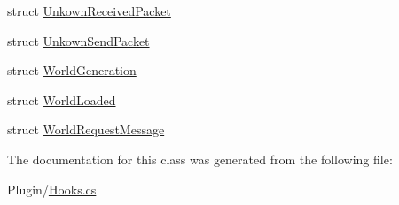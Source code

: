\begin{DoxyCompactItemize}
\item 
struct \hyperlink{structOTA_1_1Plugin_1_1HookArgs_1_1UnkownReceivedPacket}{Unkown\+Received\+Packet}
\item 
struct \hyperlink{structOTA_1_1Plugin_1_1HookArgs_1_1UnkownSendPacket}{Unkown\+Send\+Packet}
\item 
struct \hyperlink{structOTA_1_1Plugin_1_1HookArgs_1_1WorldGeneration}{World\+Generation}
\item 
struct \hyperlink{structOTA_1_1Plugin_1_1HookArgs_1_1WorldLoaded}{World\+Loaded}
\item 
struct \hyperlink{structOTA_1_1Plugin_1_1HookArgs_1_1WorldRequestMessage}{World\+Request\+Message}
\end{DoxyCompactItemize}


The documentation for this class was generated from the following file\+:\begin{DoxyCompactItemize}
\item 
Plugin/\hyperlink{Hooks_8cs}{Hooks.\+cs}\end{DoxyCompactItemize}
